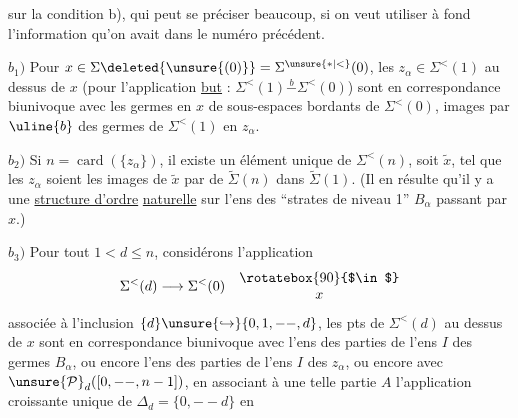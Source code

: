  sur la condition b), qui peut se préciser beaucoup, si on veut utiliser à fond l'information qu'on avait dans le numéro précédent.

$b_1)$ Pour $x\in\Sigma\deleted{\unsure{(0)}}=\Sigma^{\unsure{*|<}}(0)$, les $z_\alpha\in\Sigma^{<}(1)$ au dessus de $x$ (pour l'application \uline{but} : $\Sigma^{<}(1)\overset{b}{-}\Sigma^{<}(0)$) sont en correspondance biunivoque avec les germes  en $x$ de sous-espaces bordants de $\Sigma^{<}(0)$,  images par $\uline{b}$ des germes de $\Sigma^{<}(1)$ en  $z_\alpha$.

$b_2)$  Si $n=\operatorname{card}(\{z_\alpha\})$, il existe un élément  unique de $\Sigma^{<}(n)$, soit $\widetilde{x}$, tel que les  $z_\alpha$ soient les images de $\widetilde{x}$ par  de $\widetilde\Sigma(n)$ dans $\widetilde\Sigma(1)$.
(Il en résulte qu'il y a une \uline{structure d'ordre}  \uline{naturelle} sur l'ens des ``strates de niveau 1'' $B_\alpha$  passant par $x$.)

 $b_3)$ Pour tout  $1<d\leq n$, considérons l'application
\[
\Sigma^{<}(d)\longrightarrow\Sigma^{<}(0)\quad\begin{matrix}\rotatebox{90}{$\in$}\\x\end{matrix}
\]
 associée à l'inclusion  $\{d\}\unsure{\hookrightarrow}\{0,1,--,d\}$, les pts  de $\Sigma^{<}(d)$ au dessus de $x$ sont en correspondance biunivoque avec l'ens des parties  de l'ens \deleted{$\unsure{\Sigma}$} $I$ des germes $B_\alpha$, ou encore l'ens des parties  de l'ens $I$ des $z_\alpha$, ou encore avec $\unsure{\mathcal P}_d([0,--,n-1])$, en associant à une telle partie $A$ l'application  croissante unique de $\Delta_d=\{0,--d\}$ en
